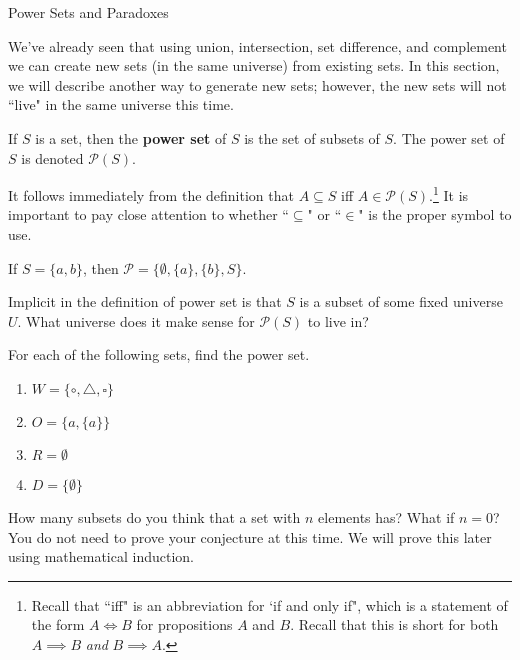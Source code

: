 \begin{section}{Power Sets and Paradoxes}

We've already seen that using union, intersection, set difference, and complement we can create new sets (in the same universe) from existing sets.  In this section, we will describe another way to generate new sets; however, the new sets will not ``live" in the same universe this time.

\begin{definition}
If $S$ is a set, then the \textbf{power set} of $S$ is the set of subsets of $S$.  The power set of $S$ is denoted $\mathcal{P}(S)$.
\end{definition}

\begin{remark}
It follows immediately from the definition that $A\subseteq S$ iff $A\in\mathcal{P}(S)$.\footnote{Recall that ``iff" is an abbreviation for `if and only if", which is a statement of the form $A\iff B$ for propositions $A$ and $B$.  Recall that this is short for both $A\implies B$ \emph{and} $B\implies A$.}  It is important to pay close attention to whether ``$\subseteq$" or ``$\in$" is the proper symbol to use.
\end{remark}

\begin{example}
If $S=\{a,b\}$, then $\mathcal{P}=\{\emptyset, \{a\}, \{b\}, S\}$.
\end{example}

\begin{question}
Implicit in the definition of power set is that $S$ is a subset of some fixed universe $U$.  What universe does it make sense for $\mathcal{P}(S)$ to live in?
\end{question}

\begin{exercise}
For each of the following sets, find the power set.
\begin{enumerate}
\item $W=\{\circ, \triangle, \square\}$
\item $O=\{a,\{a\}\}$
\item $R=\emptyset$
\item $D=\{\emptyset\}$
\end{enumerate}
\end{exercise}

\begin{conjecture}\label{size-power-set}
How many subsets do you think that a set with $n$ elements has?  What if $n=0$?  You do not need to prove your conjecture at this time.  We will prove this later using mathematical induction.
\end{conjecture}


\end{section}
